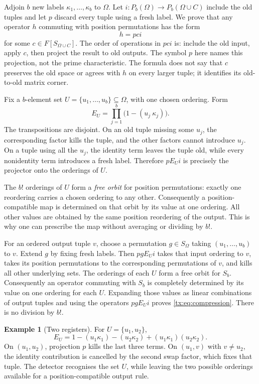 \documentclass[11pt,a4paper,oneside,openany]{book}
\theoremstyle{definition}\newtheorem{definition}[theorem]{Definition}
\newtheorem{example}[theorem]{Example}
\theoremstyle{remark}\newtheorem{remark}[theorem]{Remark}
\numberwithin{equation}{chapter}
\begin{document}
Adjoin $b$ new labels $\kappa_1,\ldots,\kappa_b$ to $\Omega$. Let $i:P_b(\Omega)\to P_b(\Omega\cup C)$ include the old tuples and let $p$ discard every tuple using a fresh label. We prove that any operator $h$ commuting with position permutations has the form
\begin{equation}\label{tx:eq:compression}h=pci\end{equation}
for some $c\in F[S_{\Omega\cup C}]$.
The order of operations in $pci$ is: include the old input, apply
$c$, then project the result to old outputs. The symbol $p$ here
names this projection, not the prime characteristic. The formula
does not say that $c$ preserves the old space or agrees with $h$
on every larger tuple; it identifies its old-to-old matrix corner.

Fix a $b$-element set $U=\{u_1,\ldots,u_b\}\subseteq\Omega$, with one chosen ordering. Form
\[E_U=\prod_{j=1}^b\bigl(1-(u_j\ \kappa_j)\bigr).\]
The transpositions are disjoint. On an old tuple missing some $u_j$, the corresponding factor kills the tuple, and the other factors cannot introduce $u_j$. On a tuple using all the $u_j$, the identity term leaves the tuple old, while every nonidentity term introduces a fresh label. Therefore $pE_Ui$ is precisely the projector onto the orderings of $U$.

The $b!$ orderings of $U$ form a \emph{free orbit} for position
permutations: exactly one reordering carries a chosen ordering to
any other. Consequently a position-compatible map is determined
on that orbit by its value at one ordering. All other values are
obtained by the same position reordering of the output. This is
why one can prescribe the map without averaging or dividing by $b!$.

For an ordered output tuple $v$, choose a permutation $g\in S_\Omega$ taking $(u_1,\ldots,u_b)$ to $v$. Extend $g$ by fixing fresh labels. Then $pgE_Ui$ takes that input ordering to $v$, takes its position permutations to the corresponding permutations of $v$, and kills all other underlying sets. The orderings of each $U$ form a free orbit for $S_b$. Consequently an operator commuting with $S_b$ is completely determined by its value on one ordering for each $U$. Expanding those values as linear combinations of output tuples and using the operators $pgE_Ui$ proves \eqref{tx:eq:compression}. There is no division by $b!$.

\begin{example}[Two registers]
For $U=\{u_1,u_2\}$,
\[E_U=1-(u_1\kappa_1)-(u_2\kappa_2)+(u_1\kappa_1)(u_2\kappa_2).
\]
On $(u_1,u_2)$, projection $p$ kills the last three terms. On $(u_1,v)$ with $v\ne u_2$, the identity contribution is cancelled by the second swap factor, which fixes that tuple. The detector recognises the set $U$, while leaving the two possible orderings available for a position-compatible output rule.
\end{example}
\end{document}
